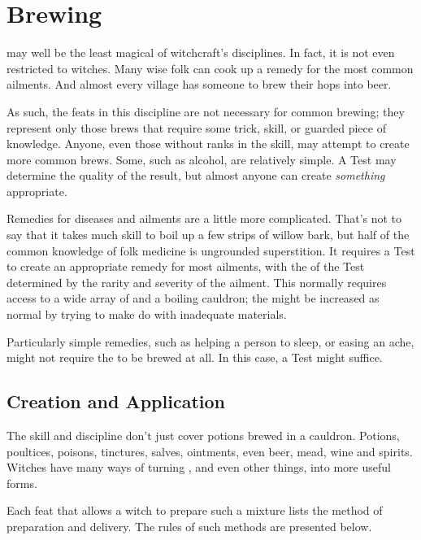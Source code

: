 \chapter{Brewing}

 may well be the least magical of witchcraft's disciplines.
In fact, it is not even restricted to witches.
Many wise folk can cook up a remedy for the most common ailments.
And almost every village has someone to brew their hops into beer.

As such, the feats in this discipline are not necessary for common brewing; they represent only those brews that require some trick, skill, or guarded piece of knowledge.
Anyone, even those without ranks in the  skill, may attempt to create more common brews.
Some, such as alcohol, are relatively simple.
A Test may determine the quality of the result, but almost anyone can create \emph{something} appropriate.

Remedies for diseases and ailments are a little more complicated.
That's not to say that it takes much skill to boil up a few strips of willow bark, but half of the common knowledge of folk medicine is ungrounded superstition.
It requires a  Test to create an appropriate remedy for most ailments, with the {\tn} of the Test determined by the rarity and severity of the ailment.
This normally requires access to a wide array of  and a boiling cauldron; the {\tn} might be increased as normal by trying to make do with inadequate materials.

Particularly simple remedies, such as helping a person to sleep, or easing an ache, might not require the  to be brewed at all.
In this case, a  Test might suffice.

\section{Creation and Application}

The  skill and  discipline don't just cover potions brewed in a cauldron.
Potions, poultices, poisons, tinctures, salves, ointments, even beer, mead, wine and spirits.
Witches have many ways of turning , and even other things, into more useful forms.

Each feat that allows a witch to prepare such a mixture lists the method of preparation and delivery.
The rules of such methods are presented below.

